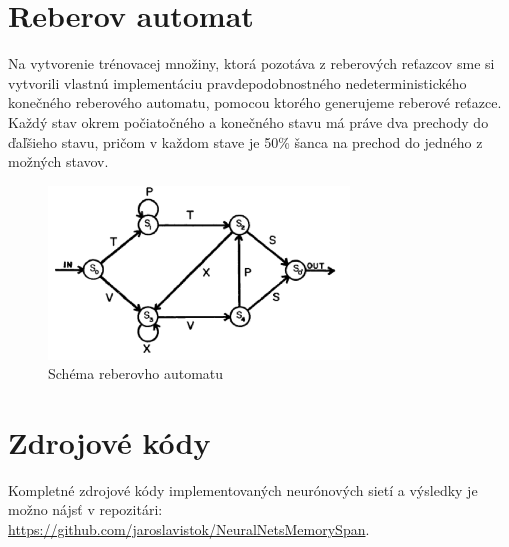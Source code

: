 \section{Reberov automat}
Na vytvorenie trénovacej množiny, ktorá pozotáva z reberových reťazcov sme si vytvorili vlastnú implementáciu pravdepodobnostného nedeterministického
konečného reberového automatu, pomocou ktorého generujeme reberové reťazce.
Každý stav okrem počiatočného a konečného stavu má práve dva prechody do ďaľšieho stavu, 
pričom v každom stave je 50\% šanca na prechod do jedného z možných stavov.
\begin{figure}[H]
    \centering
    \includegraphics[width=8cm]{assets/reber}
    \caption{Schéma reberovho automatu \protect\cite{reber_note}}
\end{figure}

\section{Zdrojové kódy}
Kompletné zdrojové kódy implementovaných neurónových sietí a výsledky je možno nájsť v repozitári: \url{https://github.com/jaroslavistok/NeuralNetsMemorySpan}.
